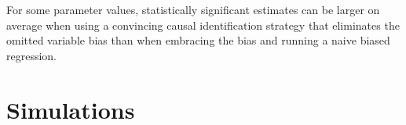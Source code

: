 \documentclass[usletter, 12pt]{article}
\begin{document}
			For some parameter values, statistically significant estimates can be larger on average when using a convincing causal identification strategy that eliminates the omitted variable bias than when embracing the bias and running a naive biased regression.	
	


				
	\section{Simulations} \label{simulations}
		
    
\end{document}
